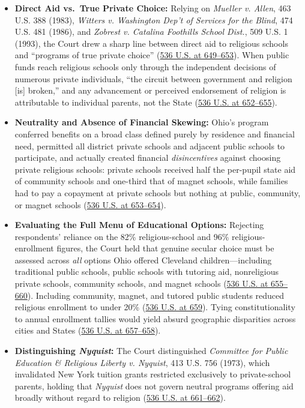 \documentclass[12pt]{article}
\begin{document}
\begin{itemize}
  \item \textbf{Direct Aid vs.\ True Private Choice:} Relying on \emph{Mueller v. Allen}, 463 U.S. 388 (1983), \emph{Witters v. Washington Dep't of Services for the Blind}, 474 U.S. 481 (1986), and \emph{Zobrest v. Catalina Foothills School Dist.}, 509 U.S. 1 (1993), the Court drew a sharp line between direct aid to religious schools and ``programs of true private choice'' (\href{https://supreme.justia.com/cases/federal/us/536/639/}{536 U.S. at 649--653}). When public funds reach religious schools only through the independent decisions of numerous private individuals, ``the circuit between government and religion [is] broken,'' and any advancement or perceived endorsement of religion is attributable to individual parents, not the State (\href{https://supreme.justia.com/cases/federal/us/536/639/}{536 U.S. at 652--655}).
  \item \textbf{Neutrality and Absence of Financial Skewing:} Ohio's program conferred benefits on a broad class defined purely by residence and financial need, permitted all district private schools and adjacent public schools to participate, and actually created financial \emph{disincentives} against choosing private religious schools: private schools received half the per-pupil state aid of community schools and one-third that of magnet schools, while families had to pay a copayment at private schools but nothing at public, community, or magnet schools (\href{https://supreme.justia.com/cases/federal/us/536/639/}{536 U.S. at 653--654}).
  \item \textbf{Evaluating the Full Menu of Educational Options:} Rejecting respondents' reliance on the 82\% religious-school and 96\% religious-enrollment figures, the Court held that genuine secular choice must be assessed across \emph{all} options Ohio offered Cleveland children---including traditional public schools, public schools with tutoring aid, nonreligious private schools, community schools, and magnet schools (\href{https://supreme.justia.com/cases/federal/us/536/639/}{536 U.S. at 655--660}). Including community, magnet, and tutored public students reduced religious enrollment to under 20\% (\href{https://supreme.justia.com/cases/federal/us/536/639/}{536 U.S. at 659}). Tying constitutionality to annual enrollment tallies would yield absurd geographic disparities across cities and States (\href{https://supreme.justia.com/cases/federal/us/536/639/}{536 U.S. at 657--658}).
  \item \textbf{Distinguishing \emph{Nyquist}:} The Court distinguished \emph{Committee for Public Education \& Religious Liberty v. Nyquist}, 413 U.S. 756 (1973), which invalidated New York tuition grants restricted exclusively to private-school parents, holding that \emph{Nyquist} does not govern neutral programs offering aid broadly without regard to religion (\href{https://supreme.justia.com/cases/federal/us/536/639/}{536 U.S. at 661--662}).
\end{itemize}
\end{document}
